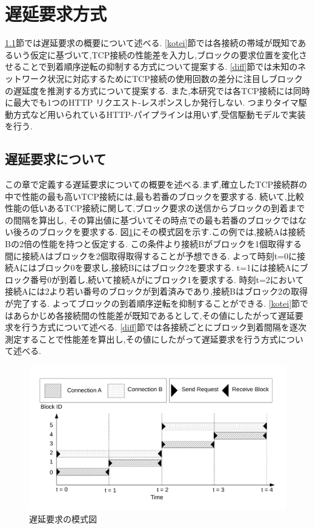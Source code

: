 \documentclass[a4j,12pt]{gradthesis_utf8}
\begin{document}
\section{遅延要求方式}
\label{chienyokyuhoshiki}
\ref{chienyokyu}節では遅延要求の概要について述べる.
\ref{kotei}節では各接続の帯域が既知であるいう仮定に基づいて,TCP接続の性能差を入力し,ブロックの要求位置を変化させることで到着順序逆転の抑制する方式について提案する.
\ref{diff}節では未知のネットワーク状況に対応するためにTCP接続の使用回数の差分に注目しブロックの遅延度を推測する方式について提案する.
また,本研究では各TCP接続には同時に最大でも1つのHTTP リクエスト-レスポンスしか発行しない.
つまりタイマ駆動方式など用いられているHTTP-パイプラインは用いず,受信駆動モデルで実装を行う.

\newpage

\subsection{遅延要求について}
\label{chienyokyu}
この章で定義する遅延要求についての概要を述べる.まず,確立したTCP接続群の中で性能の最も高いTCP接続には,最も若番のブロックを要求する.
続いて,比較性能の低いあるTCP接続に関して,ブロック要求の送信からブロックの到着までの間隔を算出し,
その算出値に基づいてその時点での最も若番のブロックではない後ろのブロックを要求する.
図\ref{delay}にその模式図を示す.この例では,接続Aは接続Bの2倍の性能を持つと仮定する.
この条件より接続Bがブロックを1個取得する間に接続Aはブロックを2個取得取得することが予想できる.
よって時刻t=0に接続Aにはブロック0を要求し,接続Bにはブロック2を要求する.
t=1には接続Aにブロック番号0が到着し,続いて接続Aがにブロック1を要求する.
時刻t=2において接続Aには2より若い番号のブロックが到着済みであり,接続Bはブロック2の取得が完了する.
よってブロックの到着順序逆転を抑制することができる.
\ref{kotei}節ではあらかじめ各接続間の性能差が既知であるとして,その値にしたがって遅延要求を行う方式について述べる.
\ref{diff}節では各接続ごとにブロック到着間隔を逐次測定することで性能差を算出し,その値にしたがって遅延要求を行う方式について述べる.

 \begin{figure}[ht]
    \centering
    \includegraphics[width=16.25cm]{figure/delay.pdf}
    \caption{遅延要求の模式図}
    \label{delay}
\end{figure}
\end{document}
